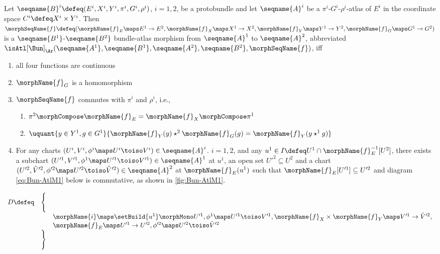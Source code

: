 \documentclass{article}
\begin{document}
\begin{definition}
\label{def:Bun-ATLmorph}
Let
$
  \seqname{B}^i
  \defeq
  (
    E^i,
    X^i,
    Y^i,
    \pi^i,
    G^i,
    \rho^i
  )
$,
$i=1,2$, be a protobundle and let $\seqname{A}^i$ be a
$\pi^i$-$G^i$-$\rho^i$-atlas of $E^i$ in the coordinate space
\nobreaks
  {{
    $C^i \defeq X^i \times Y^i$.
  }}
Then
$
  \morphSeqName{f}
  \defeq
  (
    \morphName{f}_E \maps E^1 \to E^2,
    \morphName{f}_X \maps X^1 \to X^2,
    \morphName{f}_Y \maps Y^1 \to Y^2,
    \morphName{f}_G \maps G^1 \to G^2
  )
$
is a $\seqname{B^1}$-$\seqname{B^2}$ bundle-atlas morphism from
$\seqname{A}^1$ to $\seqname{A}^2$, abbreviated \\
$
  \isAtl[\Bun]_\Ar
    (
      \seqname{A^1}, \seqname{B^1},
      \seqname{A^2}, \seqname{B^2},
      \morphSeqName{f}
    )
$,
iff
\begin{enumerate}
\item all four functions are continuous
\item $\morphName{f}_G$ is a homomorphism
\item $\morphSeqName{f}$ commutes with $\pi^i$ and $\rho^i$, i.e.,
\begin{enumerate}
\item $\pi^2 \morphCompose \morphName{f}_E = \morphName{f}_X \morphCompose \pi^1$
\item
$
  \uquant
    {{y \in Y^1},{g \in G^1}}
    {{
      \morphName{f}_Y(y) \star^2 \morphName{f}_G(g) =
      \morphName{f}_Y(y \star^1 g)
    }}
$
\end{enumerate}
\item For any charts
$(U^i, V^i, \phi^i \maps U^i \toiso V^i) \in \seqname{A}^i$. $i=1,2$,
and any $u^1 \in I \defeq U^1 \cap \morphName{f}^{-1}_E[U^2]$,
there exists a subchart
$
  (U'^1, V'^1, \phi^1 \maps U'^1 \toiso V'^1)
  \in \seqname{A}^1
$
at $u^1$, an open set $U'^2 \subseteq U^2$ and a chart
$
  (U'^2 ,\hat{V}'^2, \phi'^2 \maps U'^2 \toiso \hat{V}'^2)
  \in \seqname{A}^2
$
at $\morphName{f}_E(u^1)$ such that
$\morphName{f}_E[U'^1] \subseteq U'^2$ and diagram \eqref{eq:Bun-AtlM1}
below is commutative, as shown in \cref{fig:Bun-AtlM1}.
\end{enumerate}

\begin{equation}
\begin{array}{lll}
\label{eq:Bun-AtlM1}
D \defeq & \Biggl \{
\\
  &&
  \morphName{i} \maps \setBuild{u^1} \morphMono U'^1,
  \phi^1 \maps U'^1 \toiso V'^1,
  \morphName{f}_X \times \morphName{f}_Y \maps V'^1 \to \hat{V}'^2,
\\
  &&
  \morphName{f}_E \maps  U'^1 \to U'^2,
  \phi'^2 \maps U'^2 \toiso \hat{V}'^2
\\
& \Biggr \}
\end{array}
\end{equation}


\end{definition}
\end{document}
